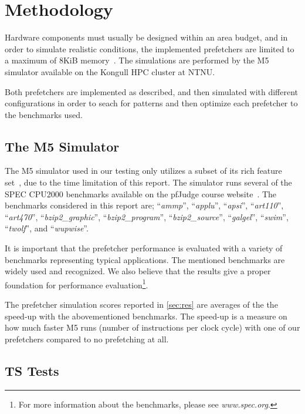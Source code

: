 \section{Methodology}

Hardware components must usually be designed within an area budget, and in order
to simulate realistic conditions, the implemented prefetchers are limited to a
maximum of 8KiB memory~\cite{guidelines}. The simulations are performed by the
M5 simulator available on the Kongull HPC cluster at NTNU.

Both prefetchers are implemented as described, and then simulated with different
configurations in order to seach for patterns and then optimize each prefetcher
to the benchmarks used.

\subsection{The M5 Simulator}

The M5 simulator used in our testing only utilizes a subset of its rich feature
set~\cite{user_doc}, due to the time limitation of this report. The simulator
runs several of the SPEC CPU2000 benchmarks available on the pfJudge course
website~\cite{guidelines}. The benchmarks considered in this report are;
``\emph{ammp}'', ``\emph{applu}'', ``\emph{apsi}'', ``\emph{art110}'',
``\emph{art470}'', ``\emph{bzip2\_graphic}'', ``\emph{bzip2\_program}'',
``\emph{bzip2\_source}'', ``\emph{galgel}'', ``\emph{swim}'', ``\emph{twolf}'',
and ``\emph{wupwise}''.

It is important that the prefetcher performance is evaluated with a variety of
benchmarks representing typical applications. The mentioned benchmarks are
widely used and recognized. We also believe that the results give a proper
foundation for performance evaluation\footnote{For more information about the
benchmarks, please see \emph{www.spec.org}.}.

The prefetcher simulation scores reported in \ref{sec:res} are averages of the
the speed-up with the abovementioned benchmarks. The speed-up is a measure on how
much faster M5 runs (number of instructions per clock cycle) with one of our
prefetchers compared to no prefetching at all.


\subsection{TS Tests}

